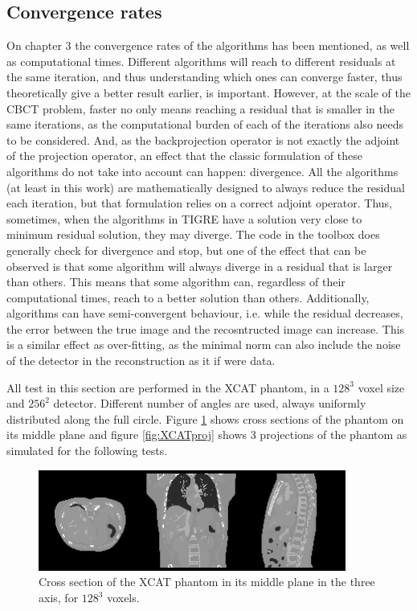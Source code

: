 \subsection{Convergence rates}

On chapter 3 the convergence rates of the algorithms has been mentioned, as well as computational times. Different algorithms will reach to different residuals at the same iteration, and thus understanding which ones can converge faster, thus theoretically give a better result earlier, is important. However, at the scale of the CBCT problem, faster no only means reaching a residual that is smaller in the same iterations, as the computational burden of each of the iterations also needs to be considered. And, as the backprojection operator is not exactly the adjoint of the projection operator, an effect that the classic formulation of these algorithms do not take into account can happen: divergence. All the algorithms (at least in this work) are mathematically designed to always reduce the residual each iteration, but that formulation relies on a correct adjoint operator. Thus, sometimes, when the algorithms in TIGRE have a solution very close to minimum residual solution, they may diverge. The code in the toolbox does generally check for divergence and stop, but one of the effect that can be observed is that some algorithm will always diverge in a residual that is larger than others. This means that some algorithm can, regardless of their computational times, reach to a better solution than others. Additionally, algorithms can have semi-convergent behaviour, i.e. while the residual decreases, the error between the true image and the recosntructed image can increase. This is a similar effect as over-fitting, as the minimal norm can also include the noise of the detector in the reconstruction as it if were data.

All test in this section are performed in the XCAT phantom\cite{XCAT}, in a $128^3$ voxel size and $256^2$ detector. Different number of angles are used, always uniformly distributed along the full circle. Figure \ref{fig:XCAT} shows cross sections of the phantom on its middle plane and figure \ref{fig:XCATproj} shows 3 projections of the phantom as simulated for the following tests. 

\begin{figure}[h]
\begin{center}

\includegraphics[width=0.9\textwidth]{Applications/XCAT.png} 
\end{center}

\caption[Cross section of the XCAT phantom]{\label{fig:XCAT} Cross section of the XCAT phantom in its middle plane in the three axis, for $128^3$ voxels.} 
\end{figure}

